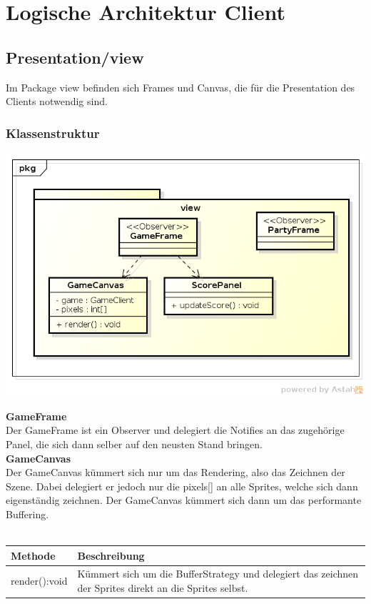 \documentclass[11pt]{scrartcl}
\begin{document}
\newpage

\section{Logische Architektur Client}
\subsection{Presentation/view}
Im Package view befinden sich Frames und Canvas, die für die Presentation des Clients notwendig sind.


\subsubsection{Klassenstruktur}
\includegraphics[scale=0.8]{ClassDiagramView}


\textbf{GameFrame}\\
Der GameFrame ist ein Observer und delegiert die Notifies an das zugehörige Panel, die sich dann selber auf den neusten Stand bringen.\\

\textbf{GameCanvas}\\
Der GameCanvas kümmert sich nur um das Rendering, also das Zeichnen der Szene. Dabei delegiert er jedoch nur die pixels[] an alle Sprites, welche sich dann eigenständig zeichnen. Der GameCanvas kümmert sich dann um das performante Buffering.\\\\
\begin{tabularx}{\linewidth}{l p{12cm}}
\textbf{Methode} & \textbf{Beschreibung}\\
\hline
render():void & Kümmert sich um die BufferStrategy und delegiert das zeichnen der Sprites direkt an die Sprites selbst.
\end{tabularx}
\end{document}
